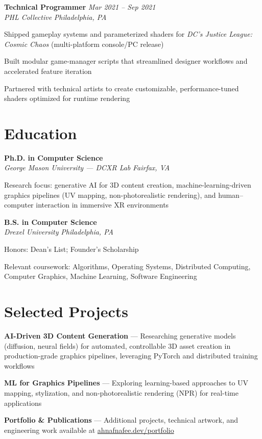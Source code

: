 \documentclass[letterpaper,10pt]{article}
\newcommand{\role}[4]{%
  \textbf{#1} \hfill \textit{#3}\\[-1pt]
  \textit{#2} \hfill \textit{#4}\par\vspace{2pt}
}
\newcommand{\education}[4]{%
  \textbf{#1} \hfill \textit{#3}\\[-1pt]
  \textit{#2} \hfill \textit{#4}\par\vspace{2pt}
}
\begin{document}
\role{Technical Programmer}{PHL Collective}{Mar 2021 -- Sep 2021}{Philadelphia, PA}
\begin{tightitemize}
  \item Shipped gameplay systems and parameterized shaders for \textit{DC's Justice League: Cosmic Chaos} (multi-platform console/PC release)
  \item Built modular game-manager scripts that streamlined designer workflows and accelerated feature iteration
  \item Partnered with technical artists to create customizable, performance-tuned shaders optimized for runtime rendering
\end{tightitemize}

\section*{Education}
\education{Ph.D. in Computer Science}{George Mason University --- DCXR Lab}{}{Fairfax, VA}
\begin{tightitemize}
  \item Research focus: generative AI for 3D content creation, machine-learning-driven graphics pipelines (UV mapping, non-photorealistic rendering), and human--computer interaction in immersive XR environments
\end{tightitemize}

\education{B.S. in Computer Science}{Drexel University}{}{Philadelphia, PA}
\begin{tightitemize}
  \item Honors: Dean's List; Founder's Scholarship
  \item Relevant coursework: Algorithms, Operating Systems, Distributed Computing, Computer Graphics, Machine Learning, Software Engineering
\end{tightitemize}

\section*{Selected Projects}
\begin{tightitemize}
\item \textbf{AI-Driven 3D Content Generation} --- Researching generative models (diffusion, neural fields) for automated, controllable 3D asset creation in production-grade graphics pipelines, leveraging PyTorch and distributed training workflows
\item \textbf{ML for Graphics Pipelines} --- Exploring learning-based approaches to UV mapping, stylization, and non-photorealistic rendering (NPR) for real-time applications
\item \textbf{Portfolio \& Publications} --- Additional projects, technical artwork, and engineering work available at \href{https://www.ahnafnafee.dev/portfolio}{ahnafnafee.dev/portfolio}
\end{tightitemize}
\end{document}
